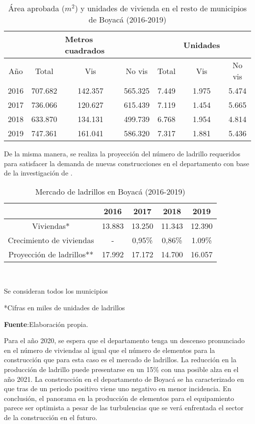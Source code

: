 \documentclass[12pt]{article}
\begin{document}
\begin{table}[H]
\centering
\caption{Área aprobada ($m^2$) y unidades de vivienda en el resto de municipios de Boyacá (2016-2019)}
\begin{tabular}{ c | c c c | c c c }
\hline
&       & \multicolumn{1}{l}{Metros cuadrados} &       &       & \multicolumn{1}{l}{Unidades}  &  \\
\hline
\hline
Año   &Total & Vis & No vis &Total & Vis & No vis\\
\hline
2016  & 707.682 & 142.357 & 565.325 & 7.449 & 1.975 & 5.474 \\
2017  & 736.066 & 120.627 & 615.439 & 7.119 & 1.454 & 5.665 \\
2018  & 633.870 & 134.131 & 499.739 & 6.768 & 1.954 & 4.814 \\
2019  & 747.361 & 161.041 & 586.320 & 7.317 & 1.881 & 5.436 \\
\hline
\end{tabular}%
\label{tab:addlabel}%
\end{table}%

De la misma manera, se realiza  la proyección del número de ladrillo requeridos para satisfacer la demanda de nuevas construcciones en el departamento con base de la investigación de \cite{buitrago2013estudio}. 



\begin{table}[H]
  \centering
  \caption{Mercado de ladrillos en Boyacá (2016-2019)}
    \begin{tabular}{c c c c c}
    \hline
          & 2016  & 2017  & 2018  & 2019 \\
          \hline
          \hline
  Viviendas* & 13.883 & 13.250 & 11.343 & 12.390 \\
    Crecimiento de viviendas &   -    & 0,95\%  & 0,86\%  & 1.09\% \\
    Proyección de ladrillos** & 17.992& 17.172 & 14.700 & 16.057 \\
\hline
    \end{tabular}\\
    \raggedright  \scriptsize *Se consideran todos los municipios\\
    \raggedright  \scriptsize **Cifras en miles de unidades de ladrillos\\
\raggedright  \scriptsize \textbf{Fuente}:Elaboración propia.
  \label{tab:addlabel}%
\end{table}%
Para el año 2020, se espera que el departamento tenga un descenso pronunciado en el número de viviendas al igual que el número de elementos para la construcción que para esta caso es el mercado de ladrillos. La reducción en la producción de ladrillo puede presentarse en un 15\%  con una posible alza en el año 2021. La construcción en el departamento de Boyacá se ha caracterizado en que tras de un periodo positivo viene uno negativo en menor incidencia. En conclusión, el panorama en la producción de elementos para el equipamiento parece ser optimista a pesar de las turbulencias que se verá enfrentada el sector de la construcción en el futuro.
\end{document}
